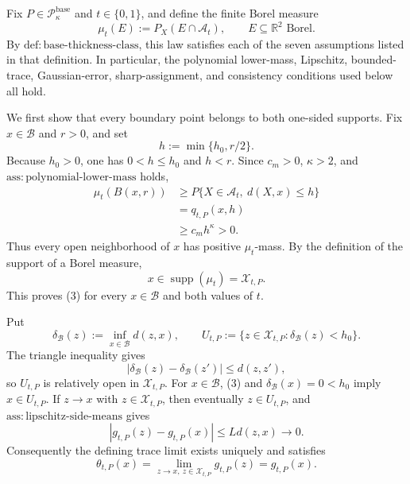 Fix \(P\in\mathcal P_{\kappa}^{\mathrm{base}}\) and \(t\in\{0,1\}\), and define the finite Borel measure
\[
 \mu_t(E):=P_X(E\cap\mathcal A_t),
 \qquad E\subseteq\mathbb R^2\text{ Borel}.
 \tag{1}
\]
By \(\mathrm{def:base\text{-}thickness\text{-}class}\), this law satisfies each of the seven assumptions listed in that definition. In particular, the polynomial lower-mass, Lipschitz, bounded-trace, Gaussian-error, sharp-assignment, and consistency conditions used below all hold.

We first show that every boundary point belongs to both one-sided supports. Fix \(x\in\mathcal B\) and \(r>0\), and set
\[
 h:=\min\{h_0,r/2\}.
\]
Because \(h_0>0\), one has \(0<h\le h_0\) and \(h<r\). Since \(c_m>0\), \(\kappa>2\), and \(\mathrm{ass:polynomial\text{-}lower\text{-}mass}\) holds,
\[
 \begin{aligned}
 \mu_t(B(x,r))
 &\ge P\{X\in\mathcal A_t,\ d(X,x)\le h\}\\
 &=q_{t,P}(x,h)\\
 &\ge c_m h^\kappa>0.
 \end{aligned}
 \tag{2}
\]
Thus every open neighborhood of \(x\) has positive \(\mu_t\)-mass. By the definition of the support of a Borel measure,
\[
 x\in\operatorname{supp}(\mu_t)=\mathcal X_{t,P}.
 \tag{3}
\]
This proves (3) for every \(x\in\mathcal B\) and both values of \(t\).

Put
\[
 \delta_{\mathcal B}(z):=\inf_{x\in\mathcal B}d(z,x),
 \qquad
 U_{t,P}:=\{z\in\mathcal X_{t,P}:\delta_{\mathcal B}(z)<h_0\}.
 \tag{4}
\]
The triangle inequality gives
\[
 |\delta_{\mathcal B}(z)-\delta_{\mathcal B}(z')|\le d(z,z'),
 \tag{5}
\]
so \(U_{t,P}\) is relatively open in \(\mathcal X_{t,P}\). For \(x\in\mathcal B\), (3) and \(\delta_{\mathcal B}(x)=0<h_0\) imply \(x\in U_{t,P}\). If \(z\to x\) with \(z\in\mathcal X_{t,P}\), then eventually \(z\in U_{t,P}\), and \(\mathrm{ass:lipschitz\text{-}side\text{-}means}\) gives
\[
 |g_{t,P}(z)-g_{t,P}(x)|\le Ld(z,x)\longrightarrow0.
\]
Consequently the defining trace limit exists uniquely and satisfies
\[
 \theta_{t,P}(x)
 =\lim_{z\to x,\ z\in\mathcal X_{t,P}}g_{t,P}(z)
 =g_{t,P}(x).
 \tag{6}
\]

